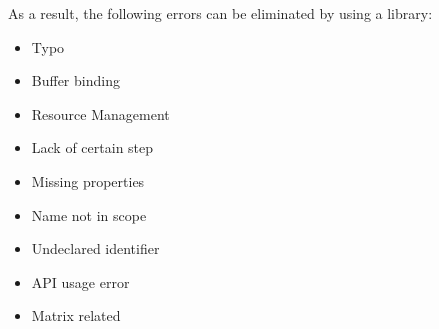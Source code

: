 As a result, the following errors can be eliminated by using a library:

\begin{itemize}
\tightlist
\item
  Typo
\item
  Buffer binding
\item
  Resource Management
\item
  Lack of certain step
\item
  Missing properties
\item
  Name not in scope
\item
  Undeclared identifier
\item
  API usage error
\item
  Matrix related
\end{itemize}
